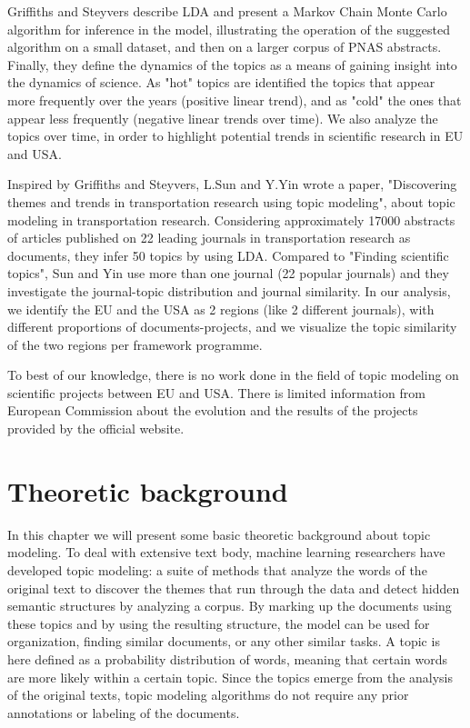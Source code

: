 \documentclass[12pt]{report}
\begin{document}
Griffiths and Steyvers describe LDA and present a Markov Chain Monte Carlo
algorithm for inference in the model, illustrating the operation of the
suggested algorithm on a small dataset, and then on a larger corpus of PNAS
abstracts. Finally, they define the dynamics of the topics as a means of gaining
insight into the dynamics of science. As "hot" topics are identified the topics
that appear more frequently over the years (positive linear trend), and as
"cold" the ones that appear less frequently (negative linear trends over time).
We also analyze the topics over time, in order to highlight potential trends in
scientific research in EU and USA.

Inspired by Griffiths and Steyvers, L.Sun and Y.Yin wrote a paper, "Discovering
themes and trends in transportation research using topic modeling",
\cite{Sun201749} about topic modeling in transportation research. 
Considering approximately 17000 abstracts of articles published on 22 
leading journals in transportation research as documents, they infer 50 
topics by using LDA. Compared to "Finding scientific topics", Sun and 
Yin use more than one journal (22 popular journals) and they
investigate the journal-topic distribution and journal similarity. In our
analysis, we identify the EU and the USA as 2 regions (like 2 different journals),
with different proportions of documents-projects, and we visualize the topic
similarity of the two regions per framework programme.

To best of our knowledge, there is no work done in the field of topic modeling
on scientific projects between EU and USA. There is limited information from
European Commission about the evolution and the results of the projects provided
by the official website.


\section{Theoretic background}

In this chapter we will present some basic theoretic background about topic
modeling. To deal with extensive text body, machine learning researchers have
developed topic modeling: a suite of methods that analyze the words of the
original text to discover the themes that run through the data and detect
hidden semantic structures by analyzing a corpus. By marking up the documents
using these topics and by using the resulting structure, the model can be used
for organization, finding similar documents, or any other similar tasks. A
topic is here defined as a probability distribution of words, meaning that
certain words are more likely within a certain topic. Since the topics emerge
from the analysis of the original texts, topic modeling algorithms do not
require any prior annotations or labeling of the documents.\cite{Blei11introductionto}
\end{document}
